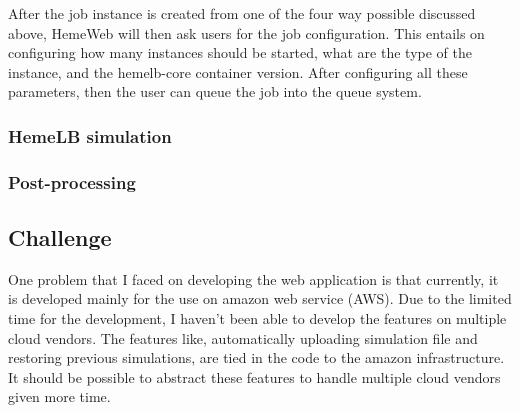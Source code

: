 After the job instance is created from one of the four way possible discussed above, HemeWeb will then ask users for the job configuration. This entails on configuring how many instances should be started, what are the type of the instance, and the hemelb-core container version.  After configuring all these parameters, then the user can queue the job into the queue system.	



\subsubsection{HemeLB simulation}

\subsubsection{Post-processing}

\subsection{Challenge}

One problem that I faced on developing the web application is that currently, it is developed mainly for the use on amazon web service (AWS). Due to the limited time for the development, I haven't been able to develop the features on multiple cloud vendors. The features like, automatically uploading simulation file and restoring previous simulations, are tied in the code to the amazon infrastructure. It should be possible to abstract these features to handle multiple cloud vendors given more time.


